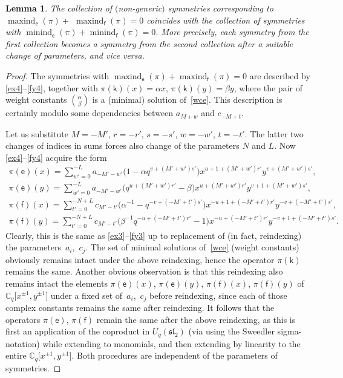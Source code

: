 \documentclass[10pt,a4paper]{amsart}
\numberwithin{equation}{section}
\newtheorem{Lemma}[Theorem]{Lemma}
\begin{document}
\begin{Lemma}\label{param_change}
The collection of $($non-generic$)$ symmetries corresponding to $\operatorname{maxind}_\mathsf{e}(\pi)+$ \linebreak $\operatorname{maxind}_\mathsf{f}(\pi)=0$ coincides with the collection of symmetries with $\operatorname{minind}_\mathsf{e}(\pi)+\operatorname{minind}_\mathsf{f}(\pi)=0$. More precisely, each symmetry from the first collection becomes a symmetry from the second collection after a suitable change of parameters, and vice versa.
\end{Lemma}

\begin{proof} The symmetries with $\operatorname{maxind}_\mathsf{e}(\pi)+ \operatorname{maxind}_\mathsf{f}(\pi)=0$ are described by \eqref{ex4}--\eqref{fy4}, together with $\pi(\mathsf{k})(x)=\alpha x$, $\pi(\mathsf{k})(y)=\beta y$, where the pair of weight constants $\binom{\alpha}{\beta}$ is a (minimal) solution of~\eqref{wce}. This description is certainly modulo some dependencies between $a_{M+w}$ and $c_{-M+t}$.

Let us substitute $M=-M'$, $r=-r'$, $s=-s'$, $w=-w'$, $t=-t'$. The latter two changes of indices in sums forces also change of the parameters $N$ and $L$. Now \eqref{ex4}--\eqref{fy4} acquire the form
\begin{gather*}
\pi(\mathsf{e})(x) =\sum_{w'=0}^{-L}a_{-M'-w'}\big(1-\alpha q^{v+(M'+w')s'}\big)x^{u+1+(M'+w')r'}y^{v+(M'+w')s'},\\
\pi(\mathsf{e})(y) =\sum_{w'=0}^{-L}a_{-M'-w'}\big(q^{u+(M'+w')r'}-\beta\big)x^{u+(M'+w')r'}y^{v+1+(M'+w')s'},\\
\pi(\mathsf{f})(x) =\sum_{t'=0}^{-N+L}c_{M'-t'}\big(\alpha^{-1}-q^{-v+(-M'+t')s'}\big)x^{-u+1+(-M'+t')r'}y^{-v+(-M'+t')s'},\\
\pi(\mathsf{f})(y) =\sum_{t'=0}^{-N+L}c_{M'-t'}\big(\beta^{-1}q^{-u+(-M'+t')r'}-1\big)x^{-u+(-M'+t')r'}y^{-v+1+(-M'+t')s'}.
\end{gather*}
Clearly, this is the same as \eqref{ex3}--\eqref{fy3} up to replacement of (in fact, reindexing) the parame\-ters~$a_i$,~$c_j$. The set of minimal solutions of~\eqref{wce} (weight constants) obviously remains intact under the above reindexing, hence the operator $\pi(\mathsf{k})$ remains the same. Another obvious observation is that this reindexing also remains intact the elements $\pi(\mathsf{e})(x)$, $\pi(\mathsf{e})(y)$, $\pi(\mathsf{f})(x)$, $\pi(\mathsf{f})(y)$ of $\mathbb{C}_q\big[x^{\pm 1},y^{\pm 1}\big]$ under a fixed set of~$a_i$,~$c_j$ before reindexing, since each of those complex constants remains the same after reindexing. It follows that the operators $\pi(\mathsf{e})$, $\pi(\mathsf{f})$ remain the same after the above reindexing, as this is first an application of the coproduct in $U_q(\mathfrak{sl}_2)$ (via using the Sweedler sigma-notation) while extending to monomials, and then extending by linearity to the entire $\mathbb{C}_q\big[x^{\pm 1},y^{\pm 1}\big]$. Both procedures are independent of the parameters of symmetries.


\end{proof}
\end{document}
